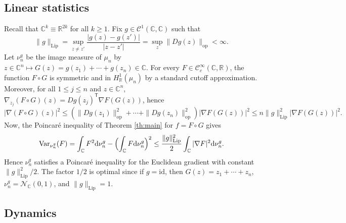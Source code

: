 \documentclass[11pt,reqno]{amsart}
\numberwithin{equation}{section}%
\numberwithin{figure}{section}%
\numberwithin{table}{section}
\theoremstyle{plain}
\theoremstyle{definition}
\begin{document}
\subsection{Linear statistics}\label{se:linear-statistics}
Recall that $\mathbb{C}^k\equiv\mathbb{R}^{2k}$ for all $k\geq1$. Fix
$g\in\mathcal{C}^1(\mathbb{C},\mathbb{C})$ such that
\begin{equation}
  \|g\|_{\mathrm{Lip}}=\sup_{z\neq z'}\frac{|g(z)-g(z')|}{|z-z'|}
  =\sup_{z}\|D g (z)\|_{\mathrm{op}}<\infty.
\end{equation}
Let $\nu^g_n$ be the image measure of $\mu_n$ by
$z\in\mathbb{C}^n\mapsto G(z)=g(z_1)+\cdots+g(z_n)\in\mathbb{C}$. For every
$F\in\mathcal{C}_c^\infty(\mathbb{C},\mathbb{R})$, the function $F\circ G$ is
symmetric and in $H^1_{\mathbb{R}}(\mu_n)$ by a standard cutoff approximation.
Moreover, for all $1\leq j\leq n$ and $z\in\mathbb{C}^n$,
$\nabla_{z_j}(F\circ G)(z)=Dg(z_j)^{\mathsf T}\nabla F(G(z))$, hence
\begin{equation}
  |\nabla(F\circ G)(z)|^2
  \leq(\|Dg(z_1)\|_{\mathrm{op}}^2+\cdots+\|Dg(z_n)\|_{\mathrm{op}}^2)
  |\nabla F(G(z))|^2
  \leq n\|g\|_{\mathrm{Lip}}^2|\nabla F(G(z))|^2.
\end{equation}
Now, the Poincaré inequality of Theorem \ref{th:main} for $f=F\circ G$ gives
\begin{equation}
  \operatorname{Var}_{\nu^g_n}(F)
  =\int_{\mathbb{C}}F^2\mathrm{d}\nu^g_n-\Bigl(\int_{\mathbb{C}}F\mathrm{d}\nu^g_n\Bigr)^2
  \leq\frac{\|g\|_{\mathrm{Lip}}^2}{2}\int_{\mathbb{C}}|\nabla F|^2\mathrm{d}\nu^g_n.
\end{equation}
Hence $\nu_n^g$ satisfies a Poincaré inequality for the Euclidean gradient
with constant $\|g\|_{\mathrm{Lip}}^2/2$. The factor $1/2$ is optimal since
if $g=\mathrm{id}$, then $G(z)=z_1+\cdots+z_n$,
$\nu^g_n=\mathcal{N}_{\mathbb{C}}(0,1)$, and $\|g\|_{\mathrm{Lip}}=1$.

\subsection{Dynamics}
\end{document}
